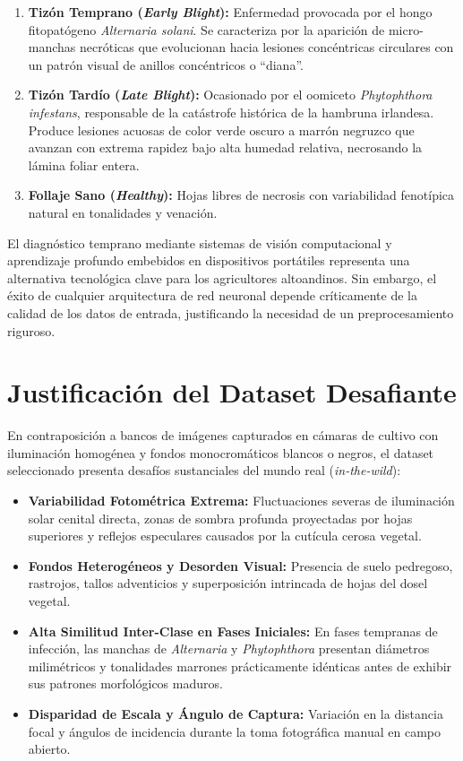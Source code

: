 \documentclass[12pt,a4paper]{article}
\begin{document}
\begin{enumerate}
    \item \textbf{Tizón Temprano (\textit{Early Blight}):} Enfermedad provocada por el hongo fitopatógeno \textit{Alternaria solani}. Se caracteriza por la aparición de micro-manchas necróticas que evolucionan hacia lesiones concéntricas circulares con un patrón visual de anillos concéntricos o ``diana''.
    \item \textbf{Tizón Tardío (\textit{Late Blight}):} Ocasionado por el oomiceto \textit{Phytophthora infestans}, responsable de la catástrofe histórica de la hambruna irlandesa. Produce lesiones acuosas de color verde oscuro a marrón negruzco que avanzan con extrema rapidez bajo alta humedad relativa, necrosando la lámina foliar entera.
    \item \textbf{Follaje Sano (\textit{Healthy}):} Hojas libres de necrosis con variabilidad fenotípica natural en tonalidades y venación.
\end{enumerate}

El diagnóstico temprano mediante sistemas de visión computacional y aprendizaje profundo embebidos en dispositivos portátiles representa una alternativa tecnológica clave para los agricultores altoandinos. Sin embargo, el éxito de cualquier arquitectura de red neuronal depende críticamente de la calidad de los datos de entrada, justificando la necesidad de un preprocesamiento riguroso.

\section{Justificación del Dataset Desafiante}

En contraposición a bancos de imágenes capturados en cámaras de cultivo con iluminación homogénea y fondos monocromáticos blancos o negros, el dataset seleccionado presenta desafíos sustanciales del mundo real (\textit{in-the-wild}):

\begin{itemize}
    \item \textbf{Variabilidad Fotométrica Extrema:} Fluctuaciones severas de iluminación solar cenital directa, zonas de sombra profunda proyectadas por hojas superiores y reflejos especulares causados por la cutícula cerosa vegetal.
    \item \textbf{Fondos Heterogéneos y Desorden Visual:} Presencia de suelo pedregoso, rastrojos, tallos adventicios y superposición intrincada de hojas del dosel vegetal.
    \item \textbf{Alta Similitud Inter-Clase en Fases Iniciales:} En fases tempranas de infección, las manchas de \textit{Alternaria} y \textit{Phytophthora} presentan diámetros milimétricos y tonalidades marrones prácticamente idénticas antes de exhibir sus patrones morfológicos maduros.
    \item \textbf{Disparidad de Escala y Ángulo de Captura:} Variación en la distancia focal y ángulos de incidencia durante la toma fotográfica manual en campo abierto.
\end{itemize}
\end{document}
